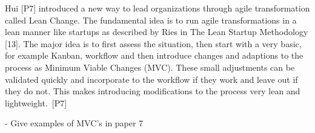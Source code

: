 Hui [P7] introduced a new way to lead organizations through agile
transformation called Lean Change. The fundamental idea is to run agile
transformations in a lean manner like startups as described by Ries in
The Lean Startup Methodology [13]. The major idea is to first assess the
situation, then start with a very basic, for example Kanban, workflow
and then introduce changes and adaptions to the process as Minimum
Viable Changes (MVC). These small adjustments can be validated quickly
and incorporate to the workflow if they work and leave out if they do
not. This makes introducing modifications to the process very lean and
lightweight. [P7]

- Give examples of MVC's in paper 7
